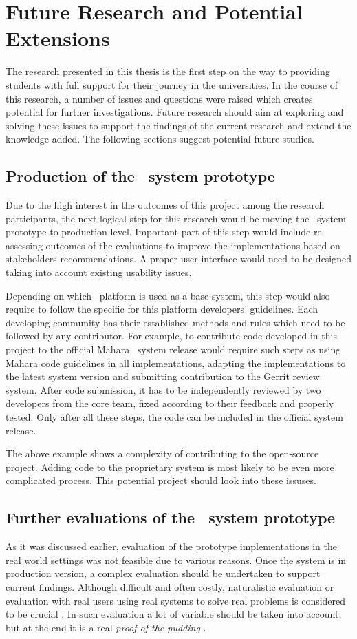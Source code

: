 \section{Future Research and Potential Extensions}
The research presented in this thesis is the first step on the way to providing
students with full support for their \LLLs journey in the universities. In the
course of this research, a number of issues and questions were raised which
creates potential for further investigations. Future research should aim at
exploring and solving these issues to support the findings of the current
research and extend the knowledge added. The following sections suggest
potential future studies.

\subsection{Production of the \ep~system prototype}
Due to the high interest in the outcomes of this project among the research
participants, the next logical step for this research would be moving the
\ep~system prototype to production level. Important part of this step would
include re-assessing outcomes of the evaluations to improve the implementations
based on stakeholders recommendations. A proper user interface would need to be
designed taking into account existing usability issues.

Depending on which \ep~platform is used as a base system, this step would also
require to follow the specific for this platform developers' guidelines. Each
developing community has their established methods and rules which need to be
followed by any contributor. For example, to contribute code developed in this
project to the official Mahara \ep~system release would require such steps as
using Mahara code guidelines in all implementations, adapting the
implementations to the latest system version and submitting contribution to the
Gerrit review system. After code submission, it has to be independently
reviewed by two developers from the core team, fixed according to their feedback
and properly tested. Only after all these steps, the code can be included in the
official system release.

The above example shows a complexity of contributing to the open-source project.
Adding code to the proprietary system is most likely to be even more complicated
process. This potential project should look into these issuses.

\subsection{Further evaluations of the \ep~system prototype}
As it was discussed earlier, evaluation of the prototype implementations in the
real world settings was not feasible due to various reasons. Once the system is
in production version, a complex evaluation should be undertaken to support
current findings. Although difficult and often costly, naturalistic evaluation
or evaluation with real users using real systems to solve real problems is
considered to be crucial \citep{Pries-Heje2008}. In such evaluation a lot of
variable should be taken into account, but at the end it is a real \textit{proof
of the pudding} \citep{Venable2010}.

